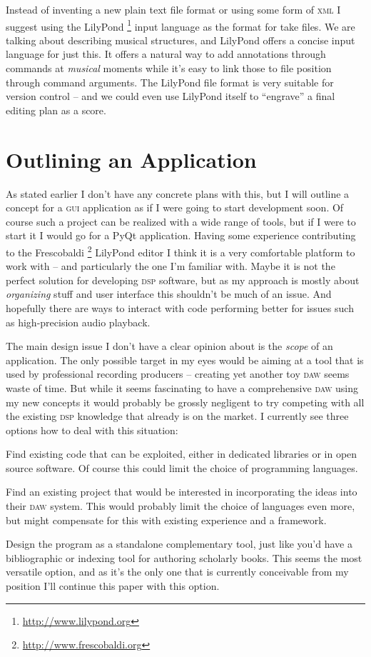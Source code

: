 \documentclass[11pt,a4paper]{article}
\begin{document}
\medskip
Instead of inventing a new plain text file format or using some form of
\textsc{xml} I suggest using the LilyPond%
\footnote{\url{http://www.lilypond.org}}
input language as the format for take files.
We are talking about describing musical structures, and LilyPond offers a
concise input language for just this.
It offers a natural way to add annotations through commands at \emph{musical}
moments while it's easy to link those to file position through command
arguments.
The LilyPond file format is very suitable for version control -- and we could
even use LilyPond itself to “engrave” a final editing plan as a score.

\section{Outlining an Application}

As stated earlier I don't have any concrete plans with this, but I will outline
a concept for a \textsc{gui} application as if I were going to start development
soon.
Of course such a project can be realized with a wide range of tools, but if I
were to start it I would go for a PyQt application.
Having some experience contributing to the Frescobaldi%
\footnote{\url{http://www.frescobaldi.org}}
LilyPond editor I think it is a very comfortable platform to work with -- and
particularly the one I'm familiar with. Maybe it is not the perfect solution
for developing \textsc{dsp} software, but as my approach is mostly about
\emph{organizing} stuff and user interface this shouldn't be much of an issue.
And hopefully there are ways to interact with code performing better for issues
such as high-precision audio playback.

The main design issue I don't have a clear opinion about is the \emph{scope} of
an application.
The only possible target in my eyes would be aiming at a tool that is used by
professional recording producers -- creating yet another toy \textsc{daw} seems
waste of time.
But while it seems fascinating to have a comprehensive \textsc{daw} using my new
concepts it would probably be grossly negligent to try competing with all the
existing \textsc{dsp} knowledge that already is on the market.
I currently see three options how to deal with this situation:

\begin{itemize*}
\item Find existing code that can be exploited, either in dedicated libraries or
in open source software.
Of course this could limit the choice of programming languages.
\item Find an existing project that would be interested in incorporating the
ideas into their \textsc{daw} system.
This would probably limit the choice of languages even more, but might
compensate for this with existing experience and a framework.
\item Design the program as a standalone complementary tool, just like you'd
have a bibliographic or indexing tool for authoring scholarly books.
This seems the most versatile option, and as it's the only one that is currently
conceivable from my position I'll continue this paper with this option.
\end{itemize*}
\end{document}
